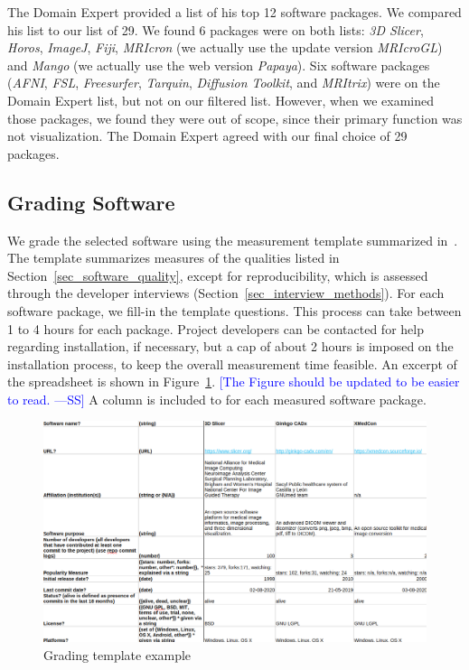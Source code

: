 \documentclass[final, 3p, times, authoryear]{elsarticle}
\newcommand{\authornote}[3]{\textcolor{#1}{[#3 ---#2]}}
\newcommand{\authornote}[3]{}
\newcommand{\wss}[1]{\authornote{blue}{SS}{#1}} %
\begin{document}
The Domain Expert provided a list of his top 12 software packages.  We compared
his list to our list of 29.  We found 6 packages were on both lists: \textit{3D
Slicer}, \textit{Horos}, \textit{ImageJ}, \textit{Fiji}, \textit{MRIcron} (we
actually use the update version \textit{MRIcroGL}) and \textit{Mango} (we
actually use the web version \textit{Papaya}).  Six software packages
(\textit{AFNI}, \textit{FSL}, \textit{Freesurfer}, \textit{Tarquin},
\textit{Diffusion Toolkit}, and \textit{MRItrix}) were on the Domain Expert
list, but not on our filtered list.  However, when we examined those packages,
we found they were out of scope, since their primary function was not
visualization.  The Domain Expert agreed with our final choice of 29 packages.

\subsection{Grading Software} \label{sec_grading_software}

We grade the selected software using the measurement template summarized
in~\citet{SmithEtAl2021}.  The template summarizes measures of the qualities
listed in Section~\ref{sec_software_quality}, except for reproducibility, which
is assessed through the developer interviews
(Section~\ref{sec_interview_methods}). For each software package, we fill-in the
template questions. This process can take between 1 to 4 hours for each package.
Project developers can be contacted for help regarding installation, if
necessary, but a cap of about 2 hours is imposed on the
installation process, to keep the overall measurement time feasible. An excerpt
of the spreadsheet is shown in Figure~\ref{fg_grading_template_example}.
\wss{The Figure should be updated to be easier to read.}  A column is included
to for each measured software package.

\begin{figure}[ht]
\includegraphics[scale=0.42]{figures/template.png}
\caption{Grading template example}
\label{fg_grading_template_example}
\end{figure}
\end{document}
